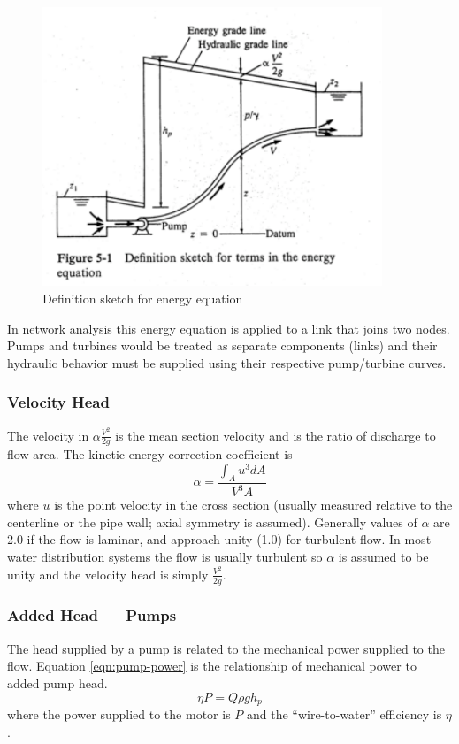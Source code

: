 \begin{figure}[h!] %
   \centering
   \includegraphics[width=4in]{./8-PipeNetworkHydraulics/closed-conduit-energy.pdf} 
   \caption{Definition sketch for energy equation}
   \label{fig:closed-conduit-energy}
\end{figure}

In network analysis this energy equation is applied to a link that joins two nodes.
Pumps and turbines would be treated as separate components (links) and their hydraulic behavior must be supplied using their respective pump/turbine curves.

\subsubsection{Velocity Head}
The velocity in $\alpha \frac{V^2}{2g}$ is the mean section velocity and is the ratio of discharge to flow area.  The kinetic energy correction coefficient is 
\begin{equation}
\alpha=\frac{\int_A u^3 dA}{V^3 A}
\label{eqn:kinetic-energy-correction}
\end{equation}
where $u$ is the point velocity in the cross section (usually measured relative to the centerline or the pipe wall; axial symmetry is assumed).   Generally values of $\alpha$ are 2.0 if the flow is laminar, and approach unity (1.0) for turbulent flow.  In most water distribution systems the flow is usually turbulent so $\alpha$ is assumed to be unity and the velocity head is simply $\frac{V^2}{2g}$.

\subsubsection{Added Head --- Pumps}
The head supplied by a pump is related to the mechanical power supplied to the flow.   Equation \ref{eqn:pump-power} is the relationship of mechanical power to added pump head.
\begin{equation}
\eta P=Q\rho g h_p
\label{eqn:pump-power}
\end{equation}
where the power supplied to the motor is $P$ and the  ``wire-to-water'' efficiency is $\eta$.

